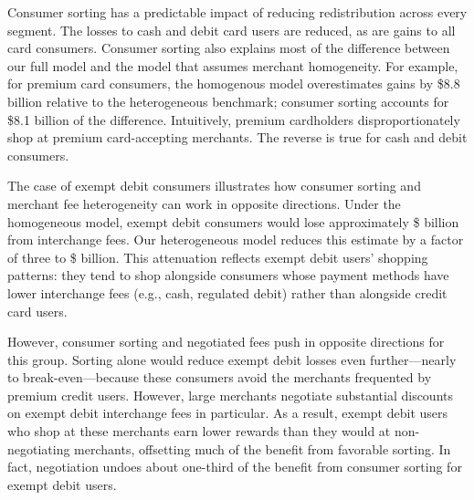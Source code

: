 \documentclass[main.tex]{subfiles}
\begin{document}
Consumer sorting has a predictable impact of reducing redistribution across every segment.
The losses to cash and debit card users are reduced, as are gains to all card consumers.
Consumer sorting also explains most of the difference between our full model and the model that assumes merchant homogeneity.
For example, for premium card consumers, the homogenous model overestimates gains by \$8.8 billion relative to the heterogeneous benchmark; consumer sorting accounts for \$8.1 billion of the difference.
Intuitively, premium cardholders disproportionately shop at premium card-accepting merchants.
The reverse is true for cash and debit consumers.

The case of exempt debit consumers illustrates how consumer sorting and merchant fee heterogeneity can work in opposite directions.
Under the homogeneous model, exempt debit consumers would lose approximately \$ billion from interchange fees.
Our heterogeneous model reduces this estimate by a factor of three to \$ billion.
This attenuation reflects exempt debit users' shopping patterns: they tend to shop alongside consumers whose payment methods have lower interchange fees (e.g., cash, regulated debit) rather than alongside credit card users.

However, consumer sorting and negotiated fees push in opposite directions for this group.
Sorting alone would reduce exempt debit losses even further---nearly to break-even---because these consumers avoid the merchants frequented by premium credit users.
However, large merchants negotiate substantial discounts on exempt debit interchange fees in particular.
As a result, exempt debit users who shop at these merchants earn lower rewards than they would at non-negotiating merchants, offsetting much of the benefit from favorable sorting.
In fact, negotiation undoes about one-third of the benefit from consumer sorting for exempt debit users.
\end{document}
